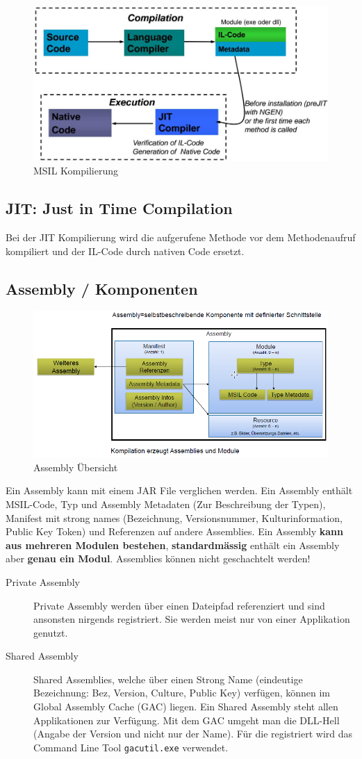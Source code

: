 \documentclass[
a4paper,
oneside,
10pt,
fleqn,
headsepline,
toc=listofnumbered, 
bibliography=totocnumbered]{scrartcl}
\begin{document}
\begin{figure}[h]
\centering
\includegraphics[width=0.5\linewidth]{images/msil_compilation}
\caption{MSIL Kompilierung}
\label{fig:msilcompilation}
\end{figure}

\subsection{JIT: Just in Time Compilation}
Bei der JIT Kompilierung wird die aufgerufene Methode vor dem Methodenaufruf kompiliert und der IL-Code durch nativen Code ersetzt.

\subsection{Assembly / Komponenten}

\begin{figure}[h!]
\centering
\includegraphics[width=0.7\linewidth]{images/assembly}
\caption{Assembly Übersicht}
\label{fig:assembly}
\end{figure}

Ein Assembly kann mit einem JAR File verglichen werden. Ein Assembly enthält MSIL-Code, Typ und Assembly Metadaten (Zur Beschreibung der Typen), Manifest mit strong names (Bezeichnung, Versionsnummer, Kulturinformation, Public Key Token) und Referenzen auf andere Assemblies. Ein Assembly \textbf{kann aus mehreren Modulen bestehen}, \textbf{standardmässig} enthält ein Assembly aber \textbf{genau ein Modul}. Assemblies können nicht geschachtelt werden!
\begin{description}
	\item[Private Assembly] Private Assembly werden über einen Dateipfad referenziert und sind ansonsten nirgends registriert. Sie werden meist nur von einer Applikation genutzt.
	\item[Shared Assembly] Shared Assemblies, welche über einen Strong Name (eindeutige Bezeichnung: Bez, Version, Culture, Public Key) verfügen, können im Global Assembly Cache (GAC) liegen. Ein Shared Assembly steht allen Applikationen zur Verfügung. Mit dem GAC umgeht man die DLL-Hell (Angabe der Version und nicht nur der Name). Für die registriert wird das Command Line Tool \lstinline|gacutil.exe| verwendet.
\end{description}
\end{document}
